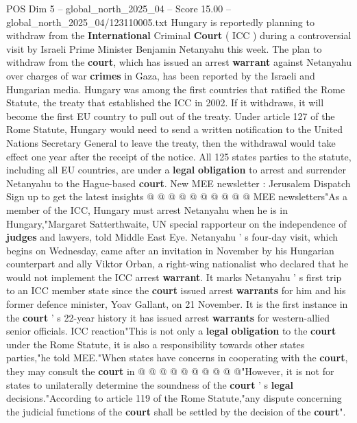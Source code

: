 \begin{textsample}{POS Dim 5 – global\_north\_2025\_04 – Score 15.00 – global\_north\_2025\_04/123110005.txt}  \label{ex:f5_pos_094}
Hungary is reportedly planning to withdraw from the \textbf{International} Criminal \textbf{Court} ( ICC ) during a controversial visit by Israeli Prime Minister Benjamin Netanyahu this week.
The plan to withdraw from the \textbf{court}, which has issued an arrest \textbf{warrant} against Netanyahu over charges of war \textbf{crimes} in Gaza, has been reported by the Israeli and Hungarian media.
Hungary was among the first countries that ratified the Rome Statute, the treaty that established the ICC in 2002.
If it withdraws, it will become the first EU country to pull out of the treaty.
Under article 127 of the Rome Statute, Hungary would need to send a written notification to the United Nations Secretary General to leave the treaty, then the withdrawal would take effect one year after the receipt of the notice.
All 125 states parties to the statute, including all EU countries, are under a \textbf{legal} \textbf{obligation} to arrest and surrender Netanyahu to the Hague-based \textbf{court}.
New MEE newsletter : Jerusalem Dispatch Sign up to get the latest insights @ @ @ @ @ @ @ @ @ @ MEE newsletters"As a member of the ICC, Hungary must arrest Netanyahu when he is in Hungary,"Margaret Satterthwaite, UN special rapporteur on the independence of \textbf{judges} and lawyers, told Middle East Eye.
Netanyahu ' s four-day visit, which begins on Wednesday, came after an invitation in November by his Hungarian counterpart and ally Viktor Orban, a right-wing nationalist who declared that he would not implement the ICC arrest \textbf{warrant}.
It marks Netanyahu ' s first trip to an ICC member state since the \textbf{court} issued arrest \textbf{warrants} for him and his former defence minister, Yoav Gallant, on 21 November.
It is the first instance in the \textbf{court} ' s 22-year history it has issued arrest \textbf{warrants} for western-allied senior officials.
ICC reaction"This is not only a \textbf{legal} \textbf{obligation} to the \textbf{court} under the Rome Statute, it is also a responsibility towards other states parties,"he told MEE."When states have concerns in cooperating with the \textbf{court}, they may consult the \textbf{court} in @ @ @ @ @ @ @ @ @ @"However, it is not for states to unilaterally determine the soundness of the \textbf{court} ' s \textbf{legal} decisions."According to article 119 of the Rome Statute,"any dispute concerning the judicial functions of the \textbf{court} shall be settled by the decision of the \textbf{court}".

\end{textsample}
